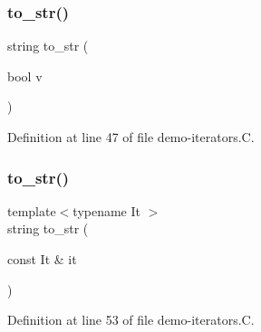 \subsubsection{\texorpdfstring{to\+\_\+str()}{to\_str()}\hspace{0.1cm}{\footnotesize\ttfamily [1/2]}}
{\footnotesize\ttfamily string to\+\_\+str (\begin{DoxyParamCaption}\item[{bool}]{v }\end{DoxyParamCaption})}



Definition at line 47 of file demo-\/iterators.\+C.

\mbox{\label{demo-iterators_8_c_af8bbc1c2b472077a39826f8635457c12}} 
\subsubsection{\texorpdfstring{to\+\_\+str()}{to\_str()}\hspace{0.1cm}{\footnotesize\ttfamily [2/2]}}
{\footnotesize\ttfamily template$<$typename It $>$ \\
string to\+\_\+str (\begin{DoxyParamCaption}\item[{const It \&}]{it }\end{DoxyParamCaption})}



Definition at line 53 of file demo-\/iterators.\+C.

